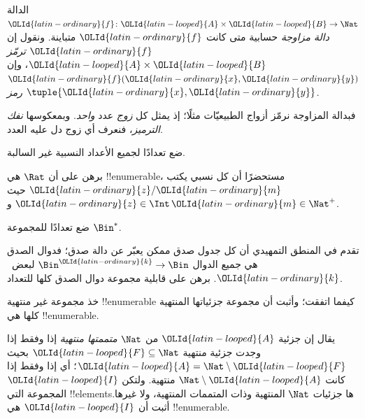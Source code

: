 \documentclass[../../../include/open-logic-section]{subfiles}
\begin{document}
\begin{defn}
الدالة $\OLId{latin-ordinary}{f}\colon \OLId{latin-looped}{A} \times \OLId{latin-looped}{B} \to \Nat$ \emph{دالة مزاوجة} حسابية
متى كانت $\OLId{latin-ordinary}{f}$ متباينة. ونقول إن $\OLId{latin-ordinary}{f}$ \emph{ترمّز} $\OLId{latin-looped}{A} \times \OLId{latin-looped}{B}$،
وإن $\OLId{latin-ordinary}{f}(\OLId{latin-ordinary}{x},\OLId{latin-ordinary}{y})$ \emph{رمز} $\tuple{\OLId{latin-ordinary}{x},\OLId{latin-ordinary}{y}}$.
\end{defn}

\begin{explain}
فبدالة المزاوجة نرمّز أزواج الطبيعيّات مثلًا؛ إذ يمثل كل
\emph{زوج} عدد \emph{واحد}. وبمعكوسها \emph{نفك الترميز}،
فنعرف أي زوج دل عليه العدد.
\end{explain}

\begin{prob}
ضع تعدادًا لجميع الأعداد النسبية غير السالبة.
\end{prob}

\begin{prob}
برهن على أن $\Rat$ هي !!{enumerable}، مستحضرًا أن كل نسبي
يكتب $\OLId{latin-ordinary}{z}/\OLId{latin-ordinary}{m}$ حيث $\OLId{latin-ordinary}{z} \in \Int$ و$\OLId{latin-ordinary}{m} \in \Nat^+$.
\end{prob}

\begin{prob}
ضع تعدادًا للمجموعة $\Bin^*$.
\end{prob}

\begin{prob}
تقدم في المنطق التمهيدي أن كل جدول صدق ممكن يعبّر عن دالة صدق؛
فدوال الصدق هي جميع الدوال $\Bin^\OLId{latin-ordinary}{k} \to \Bin$ لبعض~$\OLId{latin-ordinary}{k}$.
برهن على قابلية مجموعة دوال الصدق كلها للتعداد.
\end{prob}

\begin{prob}
خذ مجموعة غير منتهية !!{enumerable} كيفما اتفقت؛ وأثبت أن مجموعة
جزئياتها المنتهية كلها هي !!{enumerable}.
\end{prob}

\begin{prob}
يقال إن جزئية $\OLId{latin-looped}{A}$ من $\Nat$ \emph{متممتها منتهية} إذا وفقط إذا وجدت
جزئية منتهية $\OLId{latin-looped}{F}\subseteq\Nat$ بحيث $\OLId{latin-looped}{A}=\Nat\setminus \OLId{latin-looped}{F}$؛ أي إذا وفقط إذا
كانت $\Nat\setminus \OLId{latin-looped}{A}$ منتهية. ولتكن $\OLId{latin-looped}{I}$ المجموعة التي !!{element}sها
جزئيات $\Nat$ المنتهية وذات المتممات المنتهية، ولا غيرها. أثبت أن $\OLId{latin-looped}{I}$
هي !!{enumerable}.
\end{prob}
\end{document}
